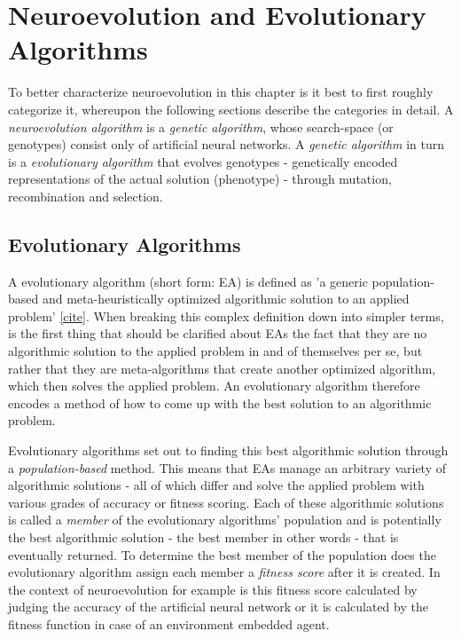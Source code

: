 \documentclass[journal, a4paper]{IEEEtran}
\begin{document}

\section{Neuroevolution and Evolutionary Algorithms}

To better characterize neuroevolution in this chapter is it best to first roughly categorize it, whereupon the following sections describe the categories in detail. A \textit{neuroevolution algorithm} is a \textit{genetic algorithm}, whose search-space (or genotypes) consist only of artificial neural networks. A \textit{genetic algorithm} in turn is a \textit{evolutionary algorithm} that evolves genotypes - genetically encoded representations of the actual solution (phenotype) - through mutation, recombination and selection.



\subsection{Evolutionary Algorithms}

A evolutionary algorithm (short form: EA) is defined as 'a generic population-based and meta-heuristically optimized algorithmic solution to an applied problem' \href{https://en.wikipedia.org/wiki/Evolutionary_algorithm}{[cite]}. When breaking this complex definition down into simpler terms, is the first thing that should be clarified about EAs the fact that they are no algorithmic solution to the applied problem in and of themselves per se, but rather that they are meta-algorithms that create another optimized algorithm, which then solves the applied problem. An evolutionary algorithm therefore encodes a method of how to come up with the best solution to an algorithmic problem.

Evolutionary algorithms set out to finding this best algorithmic solution through a \textit{population-based} method. This means that EAs manage an arbitrary variety of algorithmic solutions - all of which differ and solve the applied problem with various grades of accuracy or fitness scoring. Each of these algorithmic solutions is called a \textit{member} of the evolutionary algorithms' population and is potentially the best algorithmic solution - the best member in other words - that is eventually returned. To determine the best member of the population does the evolutionary algorithm assign each member a \textit{fitness score} after it is created. In the context of neuroevolution for example is this fitness score calculated by judging the accuracy of the artificial neural network or it is calculated by the fitness function in case of an environment embedded agent.
\end{document}
